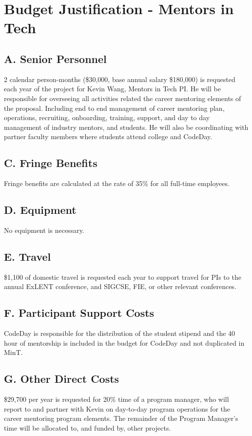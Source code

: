 \section{Budget Justification - Mentors in Tech }

\subsection{A. Senior Personnel}
2 calendar person-months (\$30,000, base annual salary \$180,000) is requested each year of the project for Kevin Wang, Mentors in Tech PI. He will be responsible for overseeing all activities related the career mentoring elements of the proposal. Including end to end management of career mentoring plan, operations, recruiting, onboarding, training, support, and day to day management of industry mentors, and students. He will also be coordinating with partner faculty members where students attend college and CodeDay.

\subsection{C. Fringe Benefits}
Fringe benefits are calculated at the rate of 35\% for all full-time employees.

\subsection{D. Equipment}
No equipment is necessary.

\subsection{E. Travel}
\$1,100 of domestic travel is requested each year to support travel for PIs to the annual ExLENT conference, and SIGCSE, FIE, or other relevant conferences.

\subsection{F. Participant Support Costs}
CodeDay is responsible for the distribution of the student stipend and the 40 hour of mentorship is included in the budget for CodeDay and not duplicated in MinT.

\subsection{G. Other Direct Costs}
\$29,700 per year is requested for 20\% time of a program manager, who will report to and partner with Kevin on day-to-day program operations for the career mentoring program elements. The remainder of the Program Manager's time will be allocated to, and funded by, other projects.

